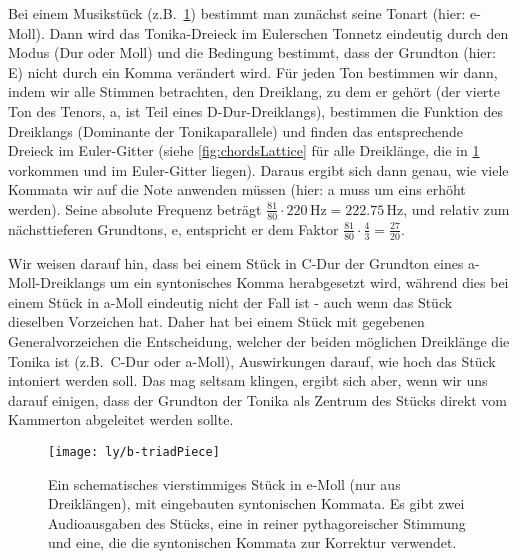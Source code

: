 \documentclass[ngerman,11pt]{scrartcl}
\begin{document}
Bei einem Musikstück (z.B.\ \cref{fig:triadPiece}) bestimmt man zunächst seine
Tonart (hier: e-Moll). Dann wird das Tonika-Dreieck im Eulerschen Tonnetz
eindeutig durch den Modus (Dur oder Moll) und die Bedingung bestimmt, dass der
Grundton (hier: E) nicht durch ein Komma verändert wird. Für jeden Ton bestimmen
wir dann, indem wir alle Stimmen betrachten, den Dreiklang, zu dem er gehört
(der vierte Ton des Tenors, a, ist Teil eines D-Dur-Dreiklangs), bestimmen die
Funktion des Dreiklangs (Dominante der Tonikaparallele) und finden das
entsprechende Dreieck im Euler-Gitter (siehe \cref{fig:chordsLattice} für alle
Dreiklänge, die in \cref{fig:triadPiece} vorkommen und im Euler-Gitter liegen).
Daraus ergibt sich dann genau, wie viele Kommata wir auf die Note anwenden
müssen (hier: a muss um eins erhöht werden). Seine absolute Frequenz beträgt
$\frac{81}{80}\cdot 220\,\text{Hz}=222.75\,\text{Hz}$, und relativ zum
nächsttieferen Grundtons, e, entspricht er dem Faktor 
$\frac{81}{80}\cdot\frac{4}{3}=\frac{27}{20}$.

Wir weisen darauf hin, dass bei einem Stück in C-Dur der Grundton eines
a-Moll-Dreiklangs um ein syntonisches Komma herabgesetzt wird, während dies bei
einem Stück in a-Moll eindeutig nicht der Fall ist - auch wenn das Stück
dieselben Vorzeichen hat. Daher hat bei einem Stück mit gegebenen
Generalvorzeichen die Entscheidung, welcher der beiden möglichen Dreiklänge die
Tonika ist (z.B.\ C-Dur oder a-Moll), Auswirkungen darauf, wie hoch das Stück
intoniert werden soll. Das mag seltsam klingen, ergibt sich aber, wenn wir uns
darauf einigen, dass der Grundton der Tonika als Zentrum des Stücks direkt vom
Kammerton abgeleitet werden sollte.

\begin{figure}
  \centering
  \texttt{[image: ly/b-triadPiece]}
  \caption{Ein schematisches vierstimmiges Stück in e-Moll (nur aus
  	Dreiklängen), mit eingebauten syntonischen Kommata. Es gibt zwei
  	Audioausgaben des Stücks, eine in reiner pythagoreischer Stimmung und eine,
  	die die syntonischen Kommata zur Korrektur
  	verwendet.}\label{fig:triadPiece}
\end{figure}
\end{document}
